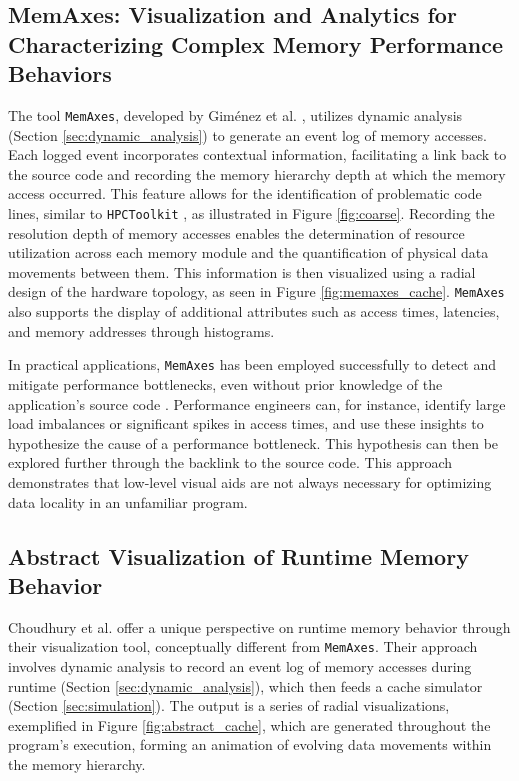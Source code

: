 \subsection{MemAxes: Visualization and Analytics for Characterizing Complex Memory Performance Behaviors}\label{sec:memaxes}
The tool \texttt{MemAxes}, developed by Giménez et al. \cite{gimenez2017memaxes}, utilizes dynamic analysis (Section \ref{sec:dynamic_analysis}) to generate an event log of memory accesses. Each logged event incorporates contextual information, facilitating a link back to the source code and recording the memory hierarchy depth at which the memory access occurred. This feature allows for the identification of problematic code lines, similar to \texttt{HPCToolkit} \cite{adhianto2010hpctoolkit}, as illustrated in Figure \ref{fig:coarse}. Recording the resolution depth of memory accesses enables the determination of resource utilization across each memory module and the quantification of physical data movements between them. This information is then visualized using a radial design of the hardware topology, as seen in Figure \ref{fig:memaxes_cache}. \texttt{MemAxes} also supports the display of additional attributes such as access times, latencies, and memory addresses through histograms.

In practical applications, \texttt{MemAxes} has been employed successfully to detect and mitigate performance bottlenecks, even without prior knowledge of the application's source code \cite{gimenez2017memaxes}. Performance engineers can, for instance, identify large load imbalances or significant spikes in access times, and use these insights to hypothesize the cause of a performance bottleneck. This hypothesis can then be explored further through the backlink to the source code. This approach demonstrates that low-level visual aids are not always necessary for optimizing data locality in an unfamiliar program.

\subsection{Abstract Visualization of Runtime Memory Behavior}\label{sec:abstract}

Choudhury et al. \cite{choudhury2011abstract} offer a unique perspective on runtime memory behavior through their visualization tool, conceptually different from \texttt{MemAxes}. Their approach involves dynamic analysis to record an event log of memory accesses during runtime (Section \ref{sec:dynamic_analysis}), which then feeds a cache simulator (Section \ref{sec:simulation}). The output is a series of radial visualizations, exemplified in Figure \ref{fig:abstract_cache}, which are generated throughout the program's execution, forming an animation of evolving data movements within the memory hierarchy.

